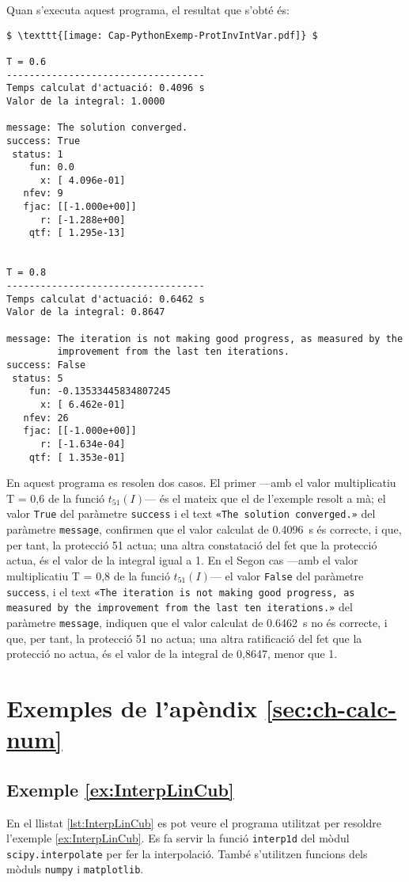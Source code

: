 Quan s'executa aquest programa, el resultat que s'obté és:
\lstset{
	language=,
	numbers=none,
	frame=none
}
\begin{lstlisting}[mathescape=true]
$ \texttt{[image: Cap-PythonExemp-ProtInvIntVar.pdf]} $

T = 0.6
-----------------------------------
Temps calculat d'actuació: 0.4096 s
Valor de la integral: 1.0000

message: The solution converged.
success: True
 status: 1
    fun: 0.0
      x: [ 4.096e-01]
   nfev: 9
   fjac: [[-1.000e+00]]
      r: [-1.288e+00]
    qtf: [ 1.295e-13]


T = 0.8
-----------------------------------
Temps calculat d'actuació: 0.6462 s
Valor de la integral: 0.8647

message: The iteration is not making good progress, as measured by the 
         improvement from the last ten iterations.
success: False
 status: 5
    fun: -0.13533445834807245
      x: [ 6.462e-01]
   nfev: 26
   fjac: [[-1.000e+00]]
      r: [-1.634e-04]
    qtf: [ 1.353e-01]
\end{lstlisting}


En aquest programa es resolen dos casos. El primer ---amb el valor multiplicatiu T = 0,6 de la funció $t_{51}(I)$--- és el mateix que el de l'exemple resolt a mà; el valor \texttt{True} del paràmetre \texttt{success} i el text  \texttt{«The solution converged.»} del paràmetre \texttt{message}, confirmen que el valor calculat de \qty{0,4096}{s} és correcte, i que, per tant, la protecció 51 actua; una altra constatació del fet que la protecció actua, és el valor de la integral igual a 1. En el Segon cas ---amb el valor multiplicatiu T = 0,8 de la funció $t_{51}(I)$--- el valor \texttt{False} del paràmetre \texttt{success}, i el text  \texttt{«The iteration is not making good progress, as measured by the improvement from the last ten iterations.»} del paràmetre \texttt{message}, indiquen que el valor calculat de \qty{0,6462}{s} no és correcte, i que, per tant, la protecció 51 no actua; una altra ratificació del fet que la protecció no actua, és el valor de la integral de 0,8647, menor que 1. 


\section{Exemples de l'apèndix \ref*{sec:ch-calc-num}}

\hypertarget{exemple:InterpLinCub}{\subsection{Exemple \ref*{ex:InterpLinCub} \InterpLinCub}}
En el llistat \vref{lst:InterpLinCub} es pot veure el programa utilitzat per resoldre l'exemple \vref{ex:InterpLinCub}. Es fa servir la funció \texttt{interp1d} del mòdul \texttt{scipy.interpolate} per fer la interpolació. També s'utilitzen funcions dels mòduls \texttt{numpy} i  \texttt{matplotlib}.


